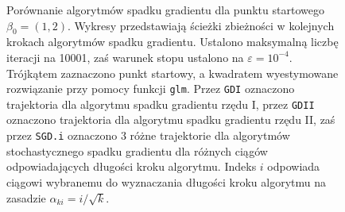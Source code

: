 \begin{figure}[hbt!]
  \caption[Porównanie algorytmów spadku gradientu dla punktu startowego $\beta_0 = (1,2)$.]{\label{fig:sc2asd}Porównanie algorytmów spadku gradientu dla punktu startowego $\beta_0 = (1,2)$. Wykresy przedstawiają ścieżki zbieżności w kolejnych krokach algorytmów spadku gradientu. Ustalono maksymalną liczbę iteracji na 10001, zaś warunek stopu ustalono na $\varepsilon=10^{-4}$. Trójkątem zaznaczono punkt startowy, a kwadratem wyestymowane rozwiązanie przy pomocy funkcji \texttt{glm}. Przez \texttt{GDI} oznaczono trajektoria dla algorytmu spadku gradientu rzędu I, przez \texttt{GDII} oznaczono trajektoria dla algorytmu spadku gradientu rzędu II, zaś przez \texttt{SGD.i} oznaczono 3 różne trajektorie dla algorytmów stochastycznego spadku gradientu dla różnych ciągów odpowiadających długości kroku algorytmu. Indeks $i$ odpowiada ciągowi wybranemu do wyznaczania długości kroku algorytmu na zasadzie $\alpha_{ki} = i/\sqrt{k}$.}
\end{figure}


